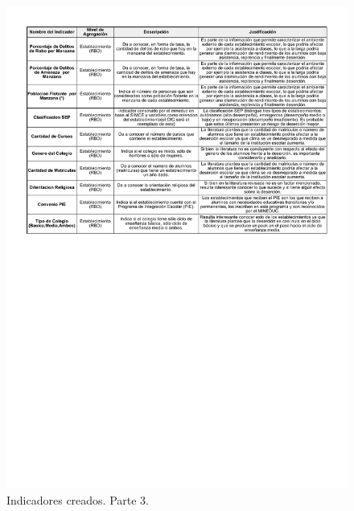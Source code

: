 \begin{figure}[H]
  \centering
    \includegraphics[width=1\textwidth]{Figuras/Indicadores3}
      \caption{Indicadores creados. Parte 3.}
    \label{fig:indicadores3}
\end{figure}